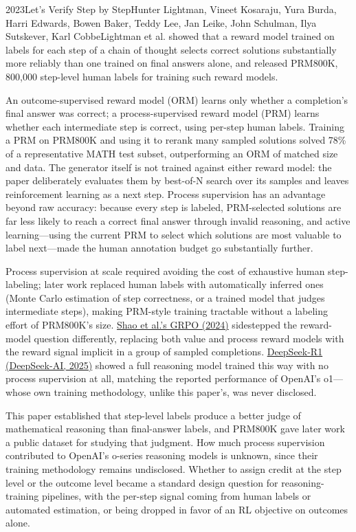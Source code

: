 
\begin{papersummary}{2023}{Let's Verify Step by Step}{Hunter Lightman, Vineet Kosaraju, Yura Burda, Harri Edwards, Bowen Baker, Teddy Lee, Jan Leike, John Schulman, Ilya Sutskever, Karl Cobbe}{Lightman et al. showed that a reward model trained on labels for each step of a chain of thought selects correct solutions substantially more reliably than one trained on final answers alone, and released PRM800K, 800,000 step-level human labels for training such reward models.}

An outcome-supervised reward model (ORM) learns only whether a completion's final answer was correct; a process-supervised reward model (PRM) learns whether each intermediate step is correct, using per-step human labels. Training a PRM on PRM800K and using it to rerank many sampled solutions solved 78\% of a representative MATH test subset, outperforming an ORM of matched size and data. The generator itself is not trained against either reward model: the paper deliberately evaluates them by best-of-N search over its samples and leaves reinforcement learning as a next step. Process supervision has an advantage beyond raw accuracy: because every step is labeled, PRM-selected solutions are far less likely to reach a correct final answer through invalid reasoning, and active learning---using the current PRM to select which solutions are most valuable to label next---made the human annotation budget go substantially further.

Process supervision at scale required avoiding the cost of exhaustive human step-labeling; later work replaced human labels with automatically inferred ones (Monte Carlo estimation of step correctness, or a trained model that judges intermediate steps), making PRM-style training tractable without a labeling effort of PRM800K's size. \hyperref[paper:shao-2024-grpo]{Shao et al.'s GRPO (2024)} sidestepped the reward-model question differently, replacing both value and process reward models with the reward signal implicit in a group of sampled completions. \hyperref[paper:deepseek-2025-r1]{DeepSeek-R1 (DeepSeek-AI, 2025)} showed a full reasoning model trained this way with no process supervision at all, matching the reported performance of OpenAI's o1---whose own training methodology, unlike this paper's, was never disclosed.

This paper established that step-level labels produce a better judge of mathematical reasoning than final-answer labels, and PRM800K gave later work a public dataset for studying that judgment. How much process supervision contributed to OpenAI's o-series reasoning models is unknown, since their training methodology remains undisclosed. Whether to assign credit at the step level or the outcome level became a standard design question for reasoning-training pipelines, with the per-step signal coming from human labels or automated estimation, or being dropped in favor of an RL objective on outcomes alone.

\end{papersummary}
